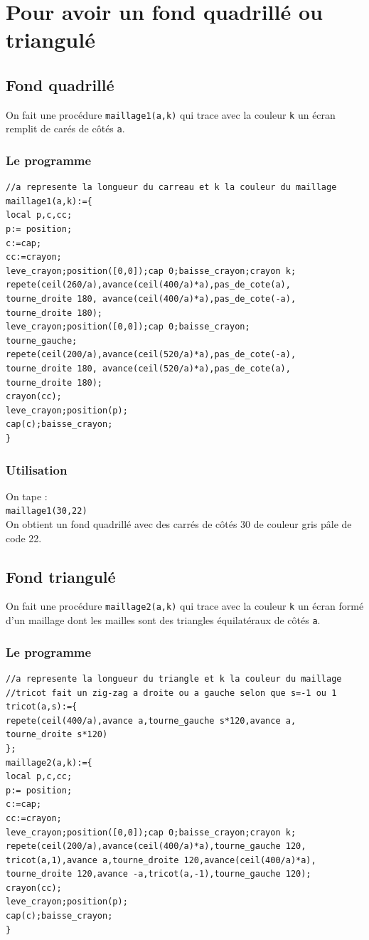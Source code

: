 \documentclass[a4paper,11pt]{book}
\begin{document}
\chapter{Pour avoir un fond quadrill\'e ou triangul\'e}
\section{Fond quadrill\'e}
On fait une proc\'edure {\tt maillage1(a,k)} qui trace avec la couleur {\tt k}
un \'ecran remplit de car\'es de c\^ot\'es {\tt a}.
\subsection{Le programme}
\begin{verbatim}
//a represente la longueur du carreau et k la couleur du maillage
maillage1(a,k):={
local p,c,cc;
p:= position;
c:=cap;
cc:=crayon;
leve_crayon;position([0,0]);cap 0;baisse_crayon;crayon k;
repete(ceil(260/a),avance(ceil(400/a)*a),pas_de_cote(a),
tourne_droite 180, avance(ceil(400/a)*a),pas_de_cote(-a),
tourne_droite 180);
leve_crayon;position([0,0]);cap 0;baisse_crayon;
tourne_gauche; 
repete(ceil(200/a),avance(ceil(520/a)*a),pas_de_cote(-a),
tourne_droite 180, avance(ceil(520/a)*a),pas_de_cote(a),
tourne_droite 180);
crayon(cc);
leve_crayon;position(p);
cap(c);baisse_crayon;
}
\end{verbatim}
\subsection{Utilisation}
On tape :\\
{\tt maillage1(30,22)}\\
On obtient un fond quadrill\'e avec des carr\'es de c\^ot\'es 30 de couleur 
gris p\^ale de code 22.

\section{Fond triangul\'e}
On fait une proc\'edure {\tt maillage2(a,k)} qui trace avec la couleur {\tt k}
un \'ecran form\'e d'un maillage dont les mailles sont des triangles 
\'equilat\'eraux de c\^ot\'es {\tt a}.
\subsection{Le programme}
\begin{verbatim}
//a represente la longueur du triangle et k la couleur du maillage
//tricot fait un zig-zag a droite ou a gauche selon que s=-1 ou 1
tricot(a,s):={
repete(ceil(400/a),avance a,tourne_gauche s*120,avance a,
tourne_droite s*120)
};
maillage2(a,k):={
local p,c,cc;
p:= position;
c:=cap;
cc:=crayon;
leve_crayon;position([0,0]);cap 0;baisse_crayon;crayon k;
repete(ceil(200/a),avance(ceil(400/a)*a),tourne_gauche 120,
tricot(a,1),avance a,tourne_droite 120,avance(ceil(400/a)*a),
tourne_droite 120,avance -a,tricot(a,-1),tourne_gauche 120);
crayon(cc);
leve_crayon;position(p);
cap(c);baisse_crayon;
}
\end{verbatim}
\end{document}
